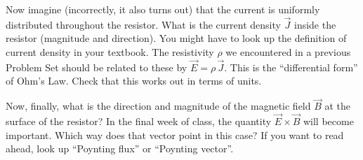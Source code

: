 \documentclass[12pt]{article}
\begin{document}
Now imagine (incorrectly, it also turns out) that the current is uniformly distributed
throughout the resistor. What is the current density $\vec{J}$ inside the
resistor (magnitude and direction). You might have to look up the definition
of current density in your textbook. The resistivity $\rho$ we encountered in a
previous Problem Set should be related to these by $\vec{E}=\rho\,\vec{J}$.
This is the ``differential form'' of Ohm's Law.
Check that this works out in terms of units.

Now, finally, what is the direction and magnitude of the magnetic field $\vec{B}$
at the surface of the resistor? In the final week of class, the quantity
$\vec{E}\times\vec{B}$ will become important. Which way does that vector point in
this case? If you want to read ahead, look up ``Poynting flux'' or ``Poynting vector''.
\end{document}

